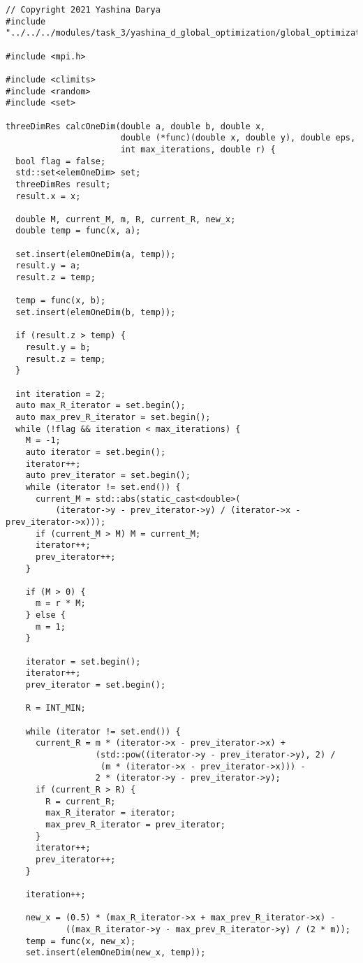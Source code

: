 \documentclass{report}
\begin{document}
\begin{lstlisting}
// Copyright 2021 Yashina Darya
#include "../../../modules/task_3/yashina_d_global_optimization/global_optimization.h"

#include <mpi.h>

#include <climits>
#include <random>
#include <set>

threeDimRes calcOneDim(double a, double b, double x,
                       double (*func)(double x, double y), double eps,
                       int max_iterations, double r) {
  bool flag = false;
  std::set<elemOneDim> set;
  threeDimRes result;
  result.x = x;

  double M, current_M, m, R, current_R, new_x;
  double temp = func(x, a);

  set.insert(elemOneDim(a, temp));
  result.y = a;
  result.z = temp;

  temp = func(x, b);
  set.insert(elemOneDim(b, temp));

  if (result.z > temp) {
    result.y = b;
    result.z = temp;
  }

  int iteration = 2;
  auto max_R_iterator = set.begin();
  auto max_prev_R_iterator = set.begin();
  while (!flag && iteration < max_iterations) {
    M = -1;
    auto iterator = set.begin();
    iterator++;
    auto prev_iterator = set.begin();
    while (iterator != set.end()) {
      current_M = std::abs(static_cast<double>(
          (iterator->y - prev_iterator->y) / (iterator->x - prev_iterator->x)));
      if (current_M > M) M = current_M;
      iterator++;
      prev_iterator++;
    }

    if (M > 0) {
      m = r * M;
    } else {
      m = 1;
    }

    iterator = set.begin();
    iterator++;
    prev_iterator = set.begin();

    R = INT_MIN;

    while (iterator != set.end()) {
      current_R = m * (iterator->x - prev_iterator->x) +
                  (std::pow((iterator->y - prev_iterator->y), 2) /
                   (m * (iterator->x - prev_iterator->x))) -
                  2 * (iterator->y - prev_iterator->y);
      if (current_R > R) {
        R = current_R;
        max_R_iterator = iterator;
        max_prev_R_iterator = prev_iterator;
      }
      iterator++;
      prev_iterator++;
    }

    iteration++;

    new_x = (0.5) * (max_R_iterator->x + max_prev_R_iterator->x) -
            ((max_R_iterator->y - max_prev_R_iterator->y) / (2 * m));
    temp = func(x, new_x);
    set.insert(elemOneDim(new_x, temp));


\end{lstlisting}
\end{document}
